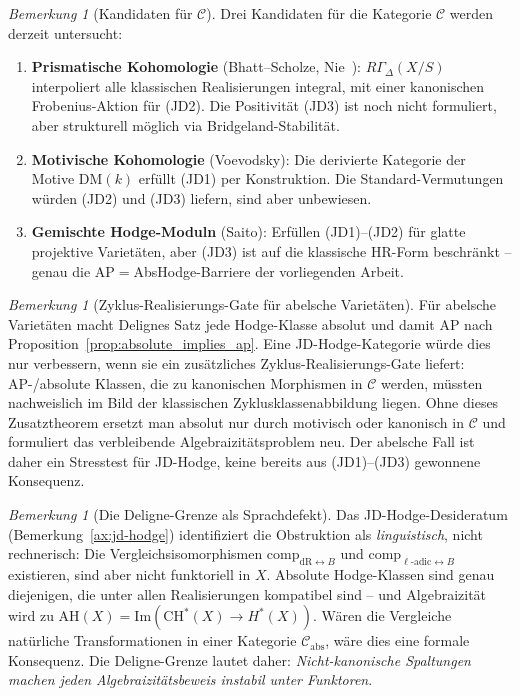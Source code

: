 \documentclass[aps,prd,twocolumn,superscriptaddress,nofootinbib]{revtex4-2}
\theoremstyle{definition}
\theoremstyle{remark}
\newtheorem{remark}[theorem]{Bemerkung}
\begin{document}
\begin{remark}[Kandidaten für $\mathcal{C}$]\label{rem:candidates-C}
Drei Kandidaten für die Kategorie $\mathcal{C}$ werden derzeit untersucht:
\begin{enumerate}
\item \textbf{Prismatische Kohomologie} (Bhatt--Scholze, Nie~\cite{Nie2021}): $R\Gamma_\Delta(X/S)$ interpoliert alle klassischen Realisierungen integral, mit einer kanonischen Frobenius-Aktion für (JD2). Die Positivität (JD3) ist noch nicht formuliert, aber strukturell möglich via Bridgeland-Stabilität.
\item \textbf{Motivische Kohomologie} (Voevodsky): Die derivierte Kategorie der Motive $\mathrm{DM}(k)$ erfüllt (JD1) per Konstruktion. Die Standard-Vermutungen würden (JD2) und (JD3) liefern, sind aber unbewiesen.
\item \textbf{Gemischte Hodge-Moduln} (Saito): Erfüllen (JD1)--(JD2) für glatte projektive Varietäten, aber (JD3) ist auf die klassische HR-Form beschränkt -- genau die AP$=$AbsHodge-Barriere der vorliegenden Arbeit.
\end{enumerate}
\end{remark}

\begin{remark}[Zyklus-Realisierungs-Gate für abelsche Varietäten]\label{rem:jd-abelian}
Für abelsche Varietäten macht Delignes Satz jede Hodge-Klasse absolut und damit AP nach Proposition~\ref{prop:absolute_implies_ap}. Eine JD-Hodge-Kategorie würde dies nur verbessern, wenn sie ein zusätzliches Zyklus-Realisierungs-Gate liefert: AP-/absolute Klassen, die zu kanonischen Morphismen in $\mathcal{C}$ werden, müssten nachweislich im Bild der klassischen Zyklusklassenabbildung liegen. Ohne dieses Zusatztheorem ersetzt man \glqq absolut\grqq{} nur durch \glqq motivisch\grqq{} oder \glqq kanonisch in $\mathcal{C}$\grqq{} und formuliert das verbleibende Algebraizitätsproblem neu. Der abelsche Fall ist daher ein Stresstest für JD-Hodge, keine bereits aus (JD1)--(JD3) gewonnene Konsequenz.
\end{remark}

\begin{remark}[Die Deligne-Grenze als Sprachdefekt]\label{rem:deligne-language}
Das JD-Hodge-Desideratum (Bemerkung~\ref{ax:jd-hodge}) identifiziert die Obstruktion als \emph{linguistisch}, nicht rechnerisch: Die Vergleichsisomorphismen $\mathrm{comp}_{\mathrm{dR} \leftrightarrow B}$ und $\mathrm{comp}_{\ell\text{-adic} \leftrightarrow B}$ existieren, sind aber nicht funktoriell in $X$. Absolute Hodge-Klassen sind genau diejenigen, die unter allen Realisierungen kompatibel sind -- und Algebraizität wird zu $\mathrm{AH}(X) = \mathrm{Im}(\mathrm{CH}^*(X) \to H^*(X))$. Wären die Vergleiche natürliche Transformationen in einer Kategorie $\mathcal{C}_{\mathrm{abs}}$, wäre dies eine formale Konsequenz. Die Deligne-Grenze lautet daher: \emph{Nicht-kanonische Spaltungen machen jeden Algebraizitätsbeweis instabil unter Funktoren}.
\end{remark}
\end{document}
